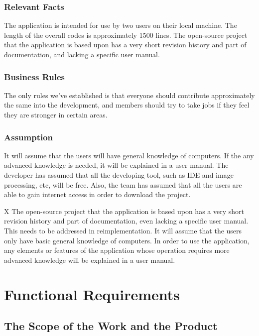 \documentclass[12pt, titlepage]{article}
\begin{document}
\subsubsection{Relevant Facts}
The application is intended for use by two users on their local machine. The length of the overall codes is approximately 1500 lines. The open-source project that the application is based upon has a very short revision history and part of documentation, and lacking a specific user manual.

\subsubsection{Business Rules}
The only rules we've established is that everyone should contribute approximately the same into the development, and members should try to take jobs if they feel they are stronger in certain areas.

\subsubsection{Assumption}
It will assume that the users will have general knowledge of computers. If the any advanced knowledge is needed, it  will be explained in a user manual. The developer has assumed that all the developing tool, such as IDE and image processing, etc, will be free. Also, the team has assumed that all the users are able to gain internet access in order to download the project.



X The open-source project that the application is based upon has a very short revision history and part of documentation, even lacking a specific user manual. This needs to be addressed in reimplementation. It will assume that the users only have basic general knowledge of computers. In order to use the application, any elements or features of the application whose operation requires more advanced knowledge will be explained in a user manual.

\section{Functional Requirements}

\subsection{The Scope of the Work and the Product}
\end{document}
